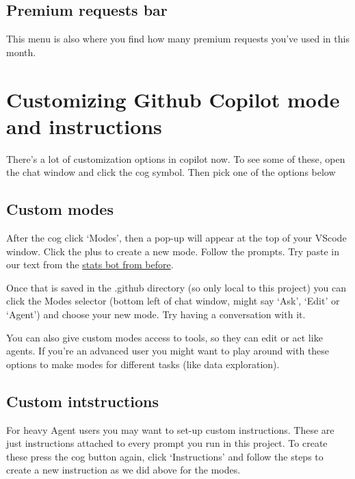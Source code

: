 \documentclass[
  letterpaper,
  DIV=11,
  numbers=noendperiod]{scrreprt}
\begin{document}
\subsection{Premium requests bar}\label{premium-requests-bar}

This menu is also where you find how many premium requests you've used
in this month.

\section{Customizing Github Copilot mode and
instructions}\label{customizing-github-copilot-mode-and-instructions}

There's a lot of customization options in copilot now. To see some of
these, open the chat window and click the cog symbol. Then pick one of
the options below

\subsection{Custom modes}\label{custom-modes}

After the cog click `Modes', then a pop-up will appear at the top of
your VScode window. Click the plus to create a new mode. Follow the
prompts. Try paste in our text from the
\href{https://raw.githubusercontent.com/cbrown5/AI-assistants-for-scientific-coding/refs/heads/main/resources/DIY-stats-bot-system.md}{stats
bot from before}.

Once that is saved in the .github directory (so only local to this
project) you can click the Modes selector (bottom left of chat window,
might say `Ask', `Edit' or `Agent') and choose your new mode. Try having
a conversation with it.

You can also give custom modes access to tools, so they can edit or act
like agents. If you're an advanced user you might want to play around
with these options to make modes for different tasks (like data
exploration).

\subsection{Custom intstructions}\label{custom-intstructions}

For heavy Agent users you may want to set-up custom instructions. These
are just instructions attached to every prompt you run in this project.
To create these press the cog button again, click `Instructions' and
follow the steps to create a new instruction as we did above for the
modes.
\end{document}
